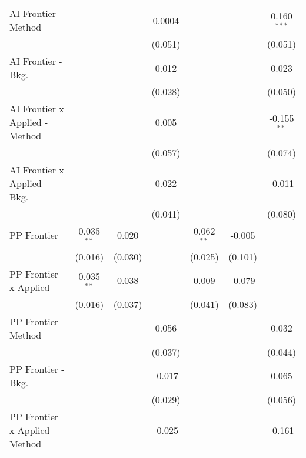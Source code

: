 \begin{tabular}{lcccccc}
   AI Frontier - Method           &              &              & 0.0004        &              &         & 0.160$^{***}$\\   
                                  &              &              & (0.051)       &              &         & (0.051)\\   
   AI Frontier - Bkg.             &              &              & 0.012         &              &         & 0.023\\   
                                  &              &              & (0.028)       &              &         & (0.050)\\   
   AI Frontier x Applied - Method &              &              & 0.005         &              &         & -0.155$^{**}$\\   
                                  &              &              & (0.057)       &              &         & (0.074)\\   
   AI Frontier x Applied - Bkg.   &              &              & 0.022         &              &         & -0.011\\   
                                  &              &              & (0.041)       &              &         & (0.080)\\   
   PP Frontier                    & 0.035$^{**}$ & 0.020        &               & 0.062$^{**}$ & -0.005  &   \\   
                                  & (0.016)      & (0.030)      &               & (0.025)      & (0.101) &   \\   
   PP Frontier x Applied          & 0.035$^{**}$ & 0.038        &               & 0.009        & -0.079  &   \\   
                                  & (0.016)      & (0.037)      &               & (0.041)      & (0.083) &   \\   
   PP Frontier - Method           &              &              & 0.056         &              &         & 0.032\\   
                                  &              &              & (0.037)       &              &         & (0.044)\\   
   PP Frontier - Bkg.             &              &              & -0.017        &              &         & 0.065\\   
                                  &              &              & (0.029)       &              &         & (0.056)\\   
   PP Frontier x Applied - Method &              &              & -0.025        &              &         & -0.161\\   

\end{tabular}
